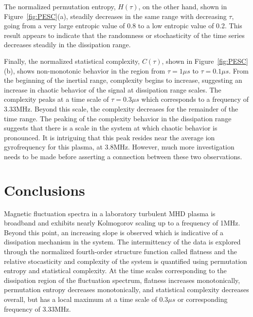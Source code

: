 \documentclass[aip,pop,amsmath,amssymb,preprint,superscriptaddress]{revtex4-1} %
\begin{document}
The normalized permutation entropy, $H(\tau)$, on the other hand, shown in Figure~\ref{fig:PESC}(a), steadily decreases in the same range with decreasing $\tau$, going from a very large entropic value of 0.8 to a low entropic value of 0.2. This result appears to indicate that the randomness or stochasticity of the time series decreases steadily in the dissipation range.

Finally, the normalized statistical complexity, $C(\tau)$, shown in Figure~\ref{fig:PESC}(b), shows non-monotonic behavior in the region from $\tau = 1\mu s$ to $\tau = 0.1\mu s$. From the beginning of the inertial range, complexity begins to increase, suggesting an increase in chaotic behavior of the signal at dissipation range scales. The complexity peaks at a time scale of $\tau = 0.3\mu s$ which corresponds to a frequency of 3.33MHz. Beyond this scale, the complexity decreases for the remainder of the time range. The peaking of the complexity behavior in the dissipation range suggests that there is a scale in the system at which chaotic behavior is pronounced. It is intriguing that this peak resides near the average ion gyrofrequency for this plasma, at 3.8MHz. However, much more investigation needs to be made before asserting a connection between these two observations.

\section{Conclusions}

Magnetic fluctuation spectra in a laboratory turbulent MHD plasma is broadband and exhibits nearly Kolmogorov scaling up to a frequency of 1MHz. Beyond this point, an increasing slope is observed which is indicative of a dissipation mechanism in the system. The intermittency of the data is explored through the normalized fourth-order structure function called flatness and the relative stocasticity and complexity of the system is quantified using permutation entropy and statistical complexity. At the time scales corresponding to the dissipation region of the fluctuation spectrum, flatness increases monotonically, permutation entropy decreases monotonically, and statistical complexity decreases overall, but has a local maximum at a time scale of $0.3\mu s$ or corresponding frequency of 3.33MHz. 
\end{document}

